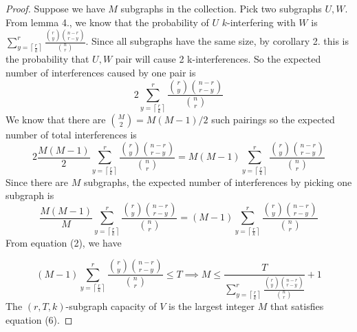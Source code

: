 \documentclass[10pt]{extarticle}
\newtheorem{theorem}{Theorem}
\theoremstyle{definition}
\begin{document}
\begin{proof}
    Suppose we have $M$ subgraphs in the collection. Pick two subgraphs $U,W$. From lemma 4., we know that the probability of $U$ $k$-interfering with $W$ is $\sum_{y = \left\lceil \frac{r}{k} \right\rceil}^{r}  \frac{\binom{r}{y} \binom{n-r}{r-y}}{\binom{n}{r}}$. Since all subgraphs have the same size, by corollary 2. this is the probability that $U,W$ pair will cause 2 k-interferences. So the expected number of interferences caused by one pair is
    $$
    2\sum_{y = \left\lceil \frac{r}{k} \right\rceil}^{r}  \frac{\binom{r}{y} \binom{n-r}{r-y}}{\binom{n}{r}} 
    $$
    We know that there are $\binom{M}{2} = M(M-1)/2$ such pairings so the expected number of total interferences is
    $$
    2 \frac{M(M-1)}{2} \sum_{y = \left\lceil \frac{r}{k} \right\rceil}^{r}  \frac{\binom{r}{y} \binom{n-r}{r-y}}{\binom{n}{r}}  =  M(M-1) \sum_{y = \left\lceil \frac{r}{k} \right\rceil}^{r}  \frac{\binom{r}{y} \binom{n-r}{r-y}}{\binom{n}{r}} 
    $$
    Since there are $M$ subgraphs, the expected number of interferences by picking one subgraph is
    $$
    \frac{M(M-1)}{M} \sum_{y = \left\lceil \frac{r}{k} \right\rceil}^{r}  \frac{\binom{r}{y} \binom{n-r}{r-y}}{\binom{n}{r}}  = (M-1) \sum_{y = \left\lceil \frac{r}{k} \right\rceil}^{r}  \frac{\binom{r}{y} \binom{n-r}{r-y}}{\binom{n}{r}} 
    $$
    From equation (2), we have 

    \begin{equation*}
        (M-1) \sum_{y = \left\lceil \frac{r}{k} \right\rceil}^{r}  \frac{\binom{r}{y} \binom{n-r}{r-y}}{\binom{n}{r}}  \le T \implies M \le \frac{T}{\sum_{y = \left\lceil \frac{r}{k} \right\rceil}^{r}  \frac{\binom{r}{y} \binom{n-r}{r-y}}{\binom{n}{r}}} + 1
    \end{equation*}
    The $(r,T,k)$-subgraph capacity of $V$ is the largest integer $M$ that satisfies equation (6).
    
\end{proof}


\end{document}
